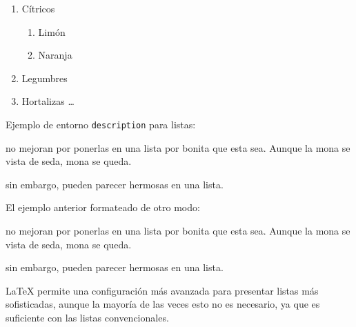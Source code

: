 \begin{enumerate}
  \item Cítricos
  \begin{enumerate}
    \item Limón
    \item Naranja
  \end{enumerate}
  \item Legumbres
  \item Hortalizas \ldots
\end{enumerate}


\noindent Ejemplo de entorno {\tt description} para listas:

\begin{description}[noitemsep]
	\item[Estupideces] no mejoran por ponerlas en una lista por bonita que esta sea. Aunque la mona se vista de seda, mona se queda.
	\item[Lucideces] sin embargo, pueden parecer hermosas en
	una lista.
\end{description}

\noindent El ejemplo anterior formateado de otro modo:

\begin{description}[style=nextline]
	\item[Estupideces] no mejoran por ponerlas en una lista por bonita que esta sea. Aunque la mona se vista de seda, mona se queda.
	\item[Lucideces] sin embargo, pueden parecer hermosas en una lista.
\end{description}

\LaTeX{} permite una configuración más avanzada para presentar listas más sofisticadas, aunque la mayoría de las veces esto no es necesario, ya que es suficiente con las listas convencionales.




